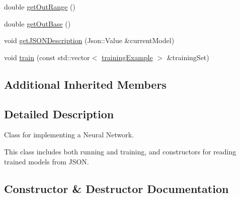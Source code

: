 \begin{DoxyCompactItemize}
\item 
double \hyperlink{classneural_network_a9890f2967b4442eda4087869c57bccfd}{get\+Out\+Range} ()
\item 
double \hyperlink{classneural_network_a4524958a9de02bd5e48d0c991d634788}{get\+Out\+Base} ()
\item 
void \hyperlink{classneural_network_a83f5c57ed3f555cd534a6f4ea425dfb7}{get\+J\+S\+O\+N\+Description} (Json\+::\+Value \&current\+Model)
\item 
void \hyperlink{classneural_network_af0da201b2b09bef38471f5ceaca7c2ea}{train} (const std\+::vector$<$ \hyperlink{structtraining_example}{training\+Example} $>$ \&training\+Set)
\end{DoxyCompactItemize}
\subsection*{Additional Inherited Members}


\subsection{Detailed Description}
Class for implementing a Neural Network.

This class includes both running and training, and constructors for reading trained models from J\+S\+ON. 

\subsection{Constructor \& Destructor Documentation}
\mbox{\label{classneural_network_a56aa499b1f9aaa80c7c21d41dce96f4e}} 

